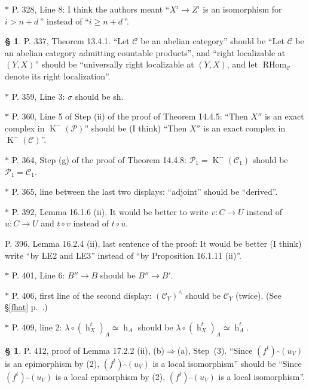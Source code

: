 \documentclass[12pt]{article}%
\theoremstyle{remark}
\theoremstyle{definition}
\newtheorem{s}[thm]{\S}%
\newcommand{\nn}{\noindent}
\newcommand{\cc}{\mathcal}
\newcommand{\mc}{\mathcal}
\newcommand{\oo}{\operatorname}
\newcommand{\C}{\mathcal C}
\newcommand{\then}{\Rightarrow}
\begin{document}
\noindent $*$ P. 328, Line 8: I think the authors meant ``$X^i\to Z^i$ is an isomorphism for $i>n+d\,$'' instead of ``$i\ge n+d\,$''.

\begin{s}\label{1341}
P. 337, Theorem 13.4.1. ``Let $\C$ be an abelian category'' should be ``Let $\C$ be an abelian category admitting countable products'', and ``right localizable at $(Y,X)$'' should be ``universally right localizable at $(Y,X)$, and let $\oo{RHom}_\C$ denote its right localization''.
\end{s}

\noindent $*$ P. 359, Line 3: $\sigma$ should be sh.


\noindent $*$ P. 360, Line 5 of Step (ii) of the proof of Theorem 14.4.5: ``Then $X''$ is an exact complex in $\oo K^-(\cc P)$'' should be (I think) ``Then $X''$ is an exact complex in $\oo K^-(\cc C)$''.


\noindent $*$ P. 364, Step (g) of the proof of Theorem 14.4.8: $\mc P_1=\oo K^-(\C_1)$ should be $\mc P_1=\C_1$.

\noindent $*$ P. 365, line between the last two displays: ``adjoint'' should be ``derived''.

\noindent $*$ P. 392, Lemma 16.1.6 (ii). It would be better to write $v:C\to U$ instead of $u:C\to U$ and $t\circ v$ instead of $t\circ u$.

\nn P. 396, Lemma 16.2.4 (ii), last sentence of the proof: It would be better (I think) write ``by LE2 and LE3'' instead of ``by Proposition 16.1.11 (ii)''.

\noindent $*$ P. 401, Line 6: $B''\to B$ should be $B''\to B'$.

\nn $*$ P. 406, first line of the second display: $(\C_Y)^\wedge$ should be $\C_Y$ (twice). (See \S\ref{fhat} p.~\pageref{fhat}.)

\nn$*$ P. 409, line 2: $\lambda\circ(\oo h_X^t)_A\simeq\oo h_A$ should be $\lambda\circ(\oo h_X^t)_A\simeq\oo h_A^t$. 

\begin{s}\label{1722}
P. 412, proof of Lemma 17.2.2 (ii), (b)$\then$(a), Step~(3). ``Since $(f^t)\widehat{\ \,}(u_V)$ is an epimorphism by (2), $(f^t)\widehat{\ \,}(u_V)$ is a local isomorphism'' should be ``Since $(f^t)\widehat{\ \,}(u_V)$ is a local epimorphism by (2), $(f^t)\widehat{\ \,}(u_V)$ is a local isomorphism''.
\end{s}
\end{document}
